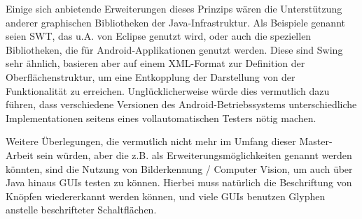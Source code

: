 Einige sich anbietende Erweiterungen dieses Prinzips wären die Unterstützung anderer graphischen Bibliotheken
der Java-Infrastruktur. Als Beispiele genannt seien SWT, das u.A. von Eclipse genutzt wird,
oder auch die speziellen Bibliotheken, die für Android-Applikationen genutzt werden.
Diese sind Swing sehr ähnlich, basieren aber auf einem XML-Format zur Definition der
Oberflächenstruktur, um eine Entkopplung der Darstellung von der Funktionalität zu erreichen.
Unglücklicherweise würde dies vermutlich dazu führen, dass verschiedene Versionen des
Android-Betriebssystems unterschiedliche Implementationen seitens eines vollautomatischen
Testers nötig machen.
 
Weitere Überlegungen, die vermutlich nicht mehr im Umfang dieser Master-Arbeit sein
würden, aber die z.B. als Erweiterungsmöglichkeiten genannt werden könnten, sind die
Nutzung von Bilderkennung / Computer Vision, um auch über Java hinaus GUIs testen zu
können. Hierbei muss natürlich die Beschriftung von Knöpfen wiedererkannt werden können,
und viele GUIs benutzen Glyphen anstelle beschrifteter Schaltflächen. 
